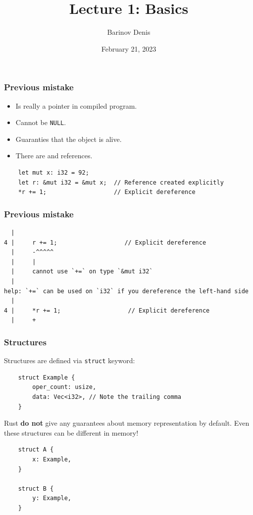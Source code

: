 \documentclass[aspectratio=1610,t]{beamer}
\title{Lecture 1: Basics}
\date{February 21, 2023}
\author{Barinov Denis}
\institute{barinov.diu@gmail.com}
\begin{document}

\begin{frame}
\maketitle
\end{frame}


\begin{frame}[fragile]
\frametitle{Previous mistake}
\begin{itemize}
    \item Is really a pointer in compiled program.
    \item Cannot be \texttt{NULL}.
    \item Guaranties that the object is alive.
    \item There are \textt{\&} and  references.
\end{itemize}

\begin{verbatim}
    let mut x: i32 = 92;
    let r: &mut i32 = &mut x;  // Reference created explicitly
    *r += 1;                   // Explicit dereference
\end{verbatim}
\end{frame}


\begin{frame}[fragile]
\frametitle{Previous mistake}

\begin{verbatim}
  |
4 |     r += 1;                   // Explicit dereference
  |     -^^^^^
  |     |
  |     cannot use `+=` on type `&mut i32`
  |
help: `+=` can be used on `i32` if you dereference the left-hand side
  |
4 |     *r += 1;                   // Explicit dereference
  |     +
\end{verbatim}
\end{frame}


\begin{frame}[fragile]
\frametitle{Structures}
Structures are defined via \texttt{struct} keyword:

\begin{verbatim}
    struct Example {
        oper_count: usize,
        data: Vec<i32>, // Note the trailing comma
    }
\end{verbatim}

Rust \textbf{do not} give any guarantees about memory representation by default. Even these structures can be different in memory!

\begin{verbatim}
    struct A {
        x: Example,
    }

    struct B {
        y: Example,
    }
\end{verbatim}
\end{frame}
\end{document}
